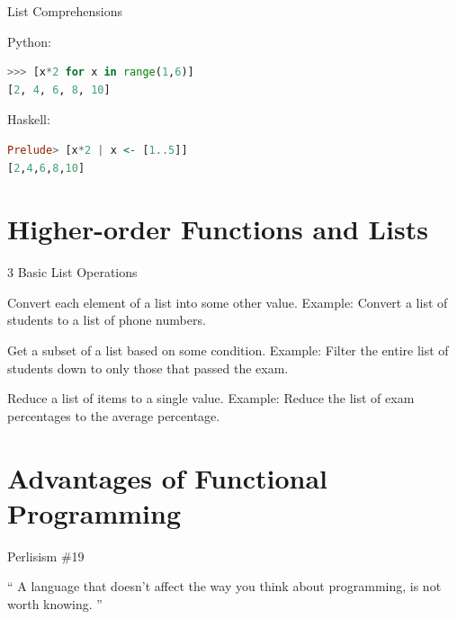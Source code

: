 \documentclass{beamer}
\begin{document}
\begin{frame}[fragile]{List Comprehensions}

Python:
  \begin{lstlisting}[language=Python]
>>> [x*2 for x in range(1,6)]
[2, 4, 6, 8, 10]
  \end{lstlisting}

Haskell:
  \begin{lstlisting}[language=Haskell]
Prelude> [x*2 | x <- [1..5]]
[2,4,6,8,10]
  \end{lstlisting}

\end{frame}

\section{Higher-order Functions and Lists}

\begin{frame}{3 Basic List Operations}

  \begin{description}[<+->]
  \item[Map] Convert each element of a list into some other value.
    Example: Convert a list of students to a list of phone numbers.
  \item[Filter] Get a subset of a list based on some condition.
    Example: Filter the entire list of students down to only those
    that passed the exam.
  \item[Fold] Reduce a list of items to a single value.
    Example: Reduce the list of exam percentages to the average percentage.
  \end{description}

\end{frame}

\section{Advantages of Functional Programming}

\begin{frame}{Perlisism \#19}

\begin{exampleblock}{}
  {\Large ``
    A language that doesn't affect the way you think about programming, is not worth knowing.
  ''}
  \vskip5mm
  \hspace*{}
\end{exampleblock}

\end{frame}
\end{document}
